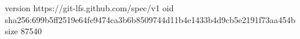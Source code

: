 version https://git-lfs.github.com/spec/v1
oid sha256:699b5ff2519e64fe9474ca3b6b8509744d11b4e1433b4d9cb5e2191f73aa454b
size 87540
